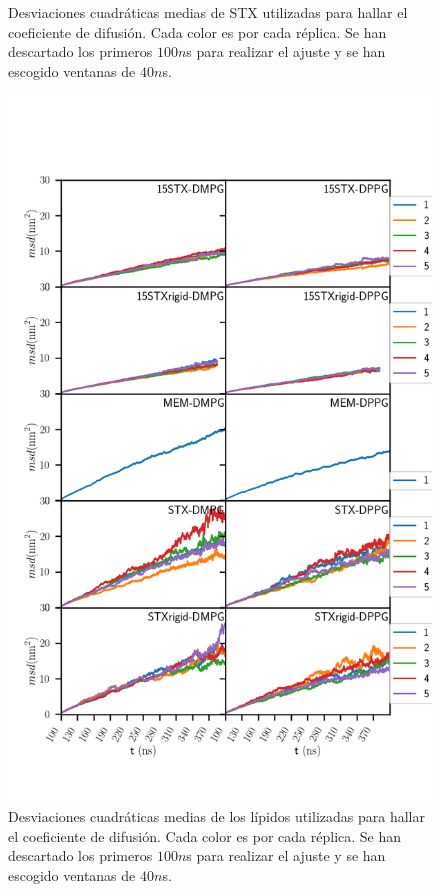 \begin{appendix}
\begin{figure}[h]
\begin{center}
  \caption{Desviaciones cuadr\'{a}ticas medias de STX utilizadas para hallar el coeficiente de difusi\'{o}n. Cada color es por cada r\'{e}plica. Se han descartado los primeros $100n$s para realizar el ajuste y se han escogido ventanas de $40n$s.}
  \label{fig:msdstx}
\end{center}
\end{figure}
\begin{figure}[ht]
\begin{center}
    \includegraphics[scale=0.28,trim={0 3cm 0 4cm},clip]{Plots/msd_lipid_40.png}
  \caption{Desviaciones cuadr\'{a}ticas medias de los l\'{i}pidos utilizadas para hallar el coeficiente de difusi\'{o}n. Cada color es por cada r\'{e}plica. Se han descartado los primeros $100n$s para realizar el ajuste y se han escogido ventanas de $40n$s.}

\end{center}
\end{figure}
\end{appendix}
